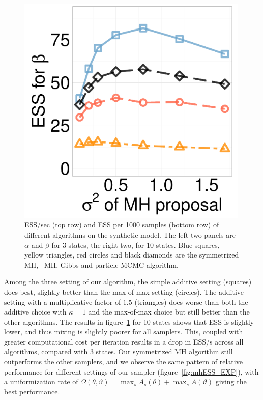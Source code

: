 \begin{figure}[H]
\begin{minipage}[hp]{0.24\linewidth}
	\end{minipage}
  \begin{minipage}[hp]{0.24\linewidth}
  \centering
    \includegraphics [width=0.99\textwidth, angle=0]{figs/ess/EXP_D10beta_k2.pdf}
	\end{minipage}
  \caption{ESS/sec (top row) and ESS per 1000 samples (bottom row) of different algorithms on the synthetic  model. The left two panels are $\alpha$ and $\beta$ for 3 states, the right two, for 10 states. Blue squares, yellow triangles, red circles and black diamonds are the symmetrized MH, \naive\ MH, Gibbs and particle MCMC algorithm.} 
     \label{fig:ESS_EXP_D10}
  \end{figure}

Among the three setting of our algorithm, the simple additive setting
 ({squares}) does best, slightly better than the {max-of-max} setting (circles). 
The {additive setting with a multiplicative factor of $1.5$} ({triangles}) does worse than both the {additive choice with $\kappa=1$ and the max-of-max choice} but still better than the other algorithms. 
The results in figure~\ref{fig:ESS_EXP_D10} for 10 states shows that ESS is slightly lower, and thus mixing is slightly poorer for all samplers. This, coupled with greater computational cost per iteration results in a drop in ESS/s across all algorithms, compared with 3 states. Our symmetrized MH algorithm still outperforms the other samplers, and we observe the same pattern of relative performance for different settings of our sampler (figure~\ref{fig:mhESS_EXP}), with a uniformization rate of  $\Omega(\theta,\vartheta) = \max_s A_s(\theta) + \max_s A(\vartheta)$ giving the best performance. 

